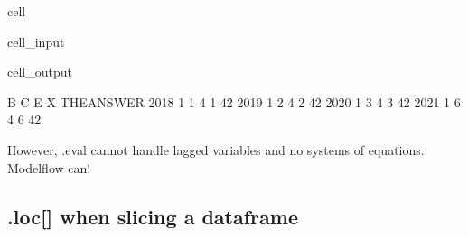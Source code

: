 \documentclass[letterpaper,10pt,english]{jupyterBook}
\begin{document}
\begin{sphinxuseclass}{cell}\begin{sphinxVerbatimInput}

\begin{sphinxuseclass}{cell_input}
\begin{sphinxVerbatim}[commandchars=\\\{\}]
\end{sphinxVerbatim}

\end{sphinxuseclass}\end{sphinxVerbatimInput}
\begin{sphinxVerbatimOutput}

\begin{sphinxuseclass}{cell_output}
\begin{sphinxVerbatim}[commandchars=\\\{\}]
      B  C  E  X  THE\PYGZus{}ANSWER
2018  1  1  4  1          42
2019  1  2  4  2          42
2020  1  3  4  3          42
2021  1  6  4  6          42
\end{sphinxVerbatim}

\end{sphinxuseclass}\end{sphinxVerbatimOutput}

\end{sphinxuseclass}
\sphinxAtStartPar
However, .eval cannot handle lagged variables and no systems of equations. Modelflow can!


\subsection{.loc{[}{]} when slicing a dataframe}
\label{\detokenize{content/notebooks/pandas/dataframes:loc-when-slicing-a-dataframe}}
\end{document}

